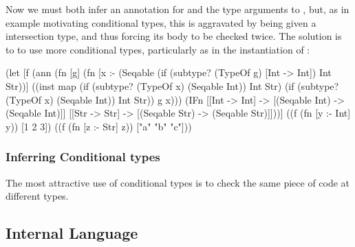 Now we must both infer an annotation for  and
the type arguments to , but, as
in example motivating conditional types,
this is aggravated by  being given a
intersection type, and thus forcing its body to be checked twice.
The solution is to to use more conditional types, particularly
as in the instantiation of :

\begin{cljlisting}
(let [f (ann (fn [g]
               (fn [x :- (Seqable (if (subtype? (TypeOf g) [Int -> Int]) Int Str))]
                 ((inst map
                        (if (subtype? (TypeOf x) (Seqable Int)) Int Str)
                        (if (subtype? (TypeOf x) (Seqable Int)) Int Str))
                  g x)))
             (IFn [[Int -> Int] -> [(Seqable Int) -> (Seqable Int)]]
                  [[Str -> Str] -> [(Seqable Str) -> (Seqable Str)]]))]
  ((f (fn [y :- Int] y)) [1 2 3])
  ((f (fn [z :- Str] z)) ["a" "b" "c"]))
\end{cljlisting}

\subsubsection{Inferring Conditional types}

The most attractive use of conditional types is to check the
same piece of code at different types.


\subsection{Internal Language}

